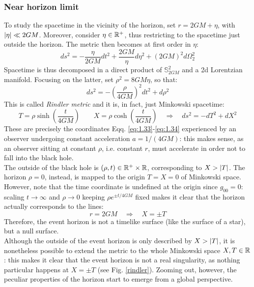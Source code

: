 \subsubsection{Near horizon limit}

To study the spacetime in the vicinity of the horizon, set $ r = 2GM + \eta $, with $ \left\lvert\eta\right\rvert \ll 2GM $. Moreover, consider $ \eta \in \mathbb{R}^+ $, thus restricting to the spacetime just outside the horizon. The metric then becomes at first order in $ \eta $:
\begin{equation*}
  ds^2 = - \frac{\eta}{2GM} dt^2 + \frac{2GM}{\eta} d\eta^2 + (2GM)^2 d\Omega_2^2
\end{equation*}
Spacetime is thus decomposed in a direct product of $ \mathbb{S}^2_{2GM} $ and a 2d Lorentzian manifold. Focusing on the latter, set $ \rho^2 = 8GM \eta $, so that:
\begin{equation}
  ds^2 = - \left( \frac{\rho}{4GM} \right)^2 dt^2 + d\rho^2
  \label{eq:6.3}
\end{equation}
This is called \textit{Rindler metric} and it is, in fact, just Minkowski spacetime:
\begin{equation*}
  T = \rho \sinh \left( \frac{t}{4GM} \right)
  \qquad
  X = \rho \cosh \left( \frac{t}{4GM} \right)
  \quad \Rightarrow \quad
  ds^2 = - dT^2 + dX^2
\end{equation*}
These are precisely the coordinates Eqq. \ref{eq:1.33}-\ref{eq:1.34} experienced by an observer undergoing constant acceleration $ a = 1 / (4GM) $: this makes sense, as an observer sitting at constant $ \rho $, i.e. constant $ r $, must accelerate in order not to fall into the black hole.\\
The outside of the black hole is $ (\rho,t) \in \mathbb{R}^+ \times \mathbb{R} $, corresponding to $ X > \left\lvert T\right\rvert $. The horizon $ \rho = 0 $, instead, is mapped to the origin $ T = X = 0 $ of Minkowski space. However, note that the time coordinate is undefined at the origin since $ g_{00} = 0 $: scaling $ t \rightarrow \infty $ and $ \rho \rightarrow 0 $ keeping $ \rho e^{\pm t / 4GM} $ fixed makes it clear that the horizon actually corresponds to the lines:
\begin{equation*}
  r = 2GM \quad \Rightarrow \quad X = \pm T
\end{equation*}
Therefore, the event horizon is not a timelike surface (like the surface of a star), but a null surface.\\
Although the outside of the event horizon is only described by $ X > \left\lvert T\right\rvert $, it is nonetheless possible to extend the metric to the whole Minkowski space $ X,T \in \mathbb{R} $: this makes it clear that the event horizon is not a real singularity, as nothing particular happens at $ X = \pm T $ (see Fig. \ref{rindler}). Zooming out, however, the peculiar properties of the horizon start to emerge from a global perspective.

